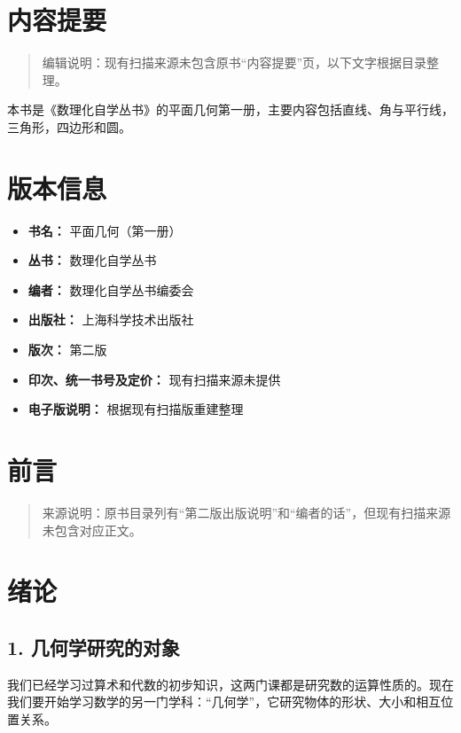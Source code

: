 \chapter*{内容提要}

\begin{quote}
编辑说明：现有扫描来源未包含原书``内容提要''页，以下文字根据目录整理。
\end{quote}

本书是《数理化自学丛书》的平面几何第一册，主要内容包括直线、角与平行线，三角形，四边形和圆。

\chapter*{版本信息}

\begin{itemize}
\item
  \textbf{书名：} 平面几何（第一册）
\item
  \textbf{丛书：} 数理化自学丛书
\item
  \textbf{编者：} 数理化自学丛书编委会
\item
  \textbf{出版社：} 上海科学技术出版社
\item
  \textbf{版次：} 第二版
\item
  \textbf{印次、统一书号及定价：} 现有扫描来源未提供
\item
  \textbf{电子版说明：} 根据现有扫描版重建整理
\end{itemize}

\chapter{前言}

\begin{quote}
来源说明：原书目录列有``第二版出版说明''和``编者的话''，但现有扫描来源未包含对应正文。
\end{quote}

\chapter{绪论}

\section{1.
几何学研究的对象}

我们已经学习过算术和代数的初步知识，这两门课都是研究数的运算性质的。现在我们要开始学习数学的另一门学科：``几何学''，它研究物体的形状、大小和相互位置关系。

